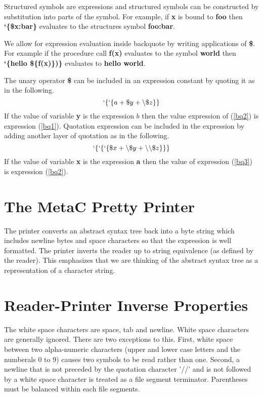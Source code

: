 \documentclass{article}
\begin{document}
Structured symbols are expressions and structured symbols can be constructed by substitution into parts of the symbol.
For example, if {\bf x} is bound to {\bf foo} then {\bf `\{\$x:bar\}} evaluates to the structures symbol {\bf foo:bar}.

We allow for expression evaluation inside backquote by writing applications of {\bf \$}.  For example if the procedure call {\bf f(x)} evaluates to the symbol {\bf world} then
{\bf `\{hello \$\{f(x)\})\}} evaluates to {\bf hello world}.

The unary operator {\bf \$} can be included in an expression constant by quoting it as in the following.
\begin{equation}
\label{bq2}
`\{`\{a + \$y + \backslash\$z\}\}
\end{equation}
If the value of variable {\bf y} is the expression $b$ then the value expression of (\ref{bq2}) is expression (\ref{bq1}).
Quotation expression can be included in the expression by adding another layer of quotation as in the following.
\begin{equation}
\label{bq3}
`\{`\{`\{\$x + \backslash\$y + \backslash\backslash\$z\}\}\}
\end{equation}
If the value of variable {\bf x} is the expression {\bf a} then the value of expression (\ref{bq3}) is expression (\ref{bq2}).


\section{The MetaC Pretty Printer}

The printer converts an abstract syntax tree back into a byte string which includes newline bytes and space characters
so that the expression is well formatted. The printer inverts the reader up to string equivalence (as defined by the reader).
This emphasizes that we are thinking of the abstract syntax tree as a representation of a character string.

\section{Reader-Printer Inverse Properties}

The white space characters are space, tab and newline.  White space characters are generally ignored.  There are two exceptions to this.
First, white space between two alpha-numeric characters (upper and lower case letters and the numberals 0 to 9) causes two symbols to be read rather than one.
Second, a newline that is not preceded by the quotation character '//' and is not followed by a white space character is
treated as a file segment terminator.  Parentheses must be balanced within each file segments.
\end{document}
